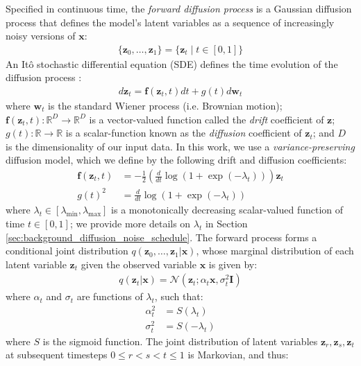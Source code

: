 \documentclass[ oneside,%
                    author={George Herbert},
                    degree={MSci},
                     title={Video Diffusion Models for Climate Simulations},
                  subtitle={}]{dissertation}
\begin{document}
Specified in continuous time, the \textit{forward diffusion process} is a Gaussian diffusion process that defines the model's latent variables as a sequence of increasingly noisy versions of $\mathbf{x}$:
\begin{align}
      \{\mathbf{z}_0,\ldots,\mathbf{z}_1\}=\{\mathbf{z}_t\mid t\in[0,1]\}
\end{align}
An It\^{o} stochastic differential equation (SDE) defines the time evolution of the diffusion process \cite{Score_Based_Song}:
\begin{align}
      d\mathbf{z}_t=\mathbf{f}(\mathbf{z}_t,t)dt + g(t)d\mathbf{w}_t\label{eq:forward_sde}
\end{align}
where $\mathbf{w}_t$ is the standard Wiener process (i.e. Brownian motion); $\mathbf{f}(\mathbf{z}_t, t):\mathbb{R}^D\to\mathbb{R}^D$ is a vector-valued function called the \textit{drift} coefficient of $\mathbf{z}$; $g(t):\mathbb{R}\to\mathbb{R}$ is a scalar-function known as the \textit{diffusion} coefficient of $\mathbf{z}_t$; and $D$ is the dimensionality of our input data. In this work, we use a \textit{variance-preserving} diffusion model, which we define by the following drift and diffusion coefficients:
\begin{align}
      \mathbf{f}(\mathbf{z}_t,t)&=-\frac{1}{2}\left(\frac{d}{dt}\log\left(1+\exp(-\lambda_t)\right)\right)\mathbf{z}_t\\
      g(t)^2&=\frac{d}{dt}\log\left(1+\exp(-\lambda_t)\right)\label{eq:diffusion_coefficient_scalar}
\end{align}
where $\lambda_t\in[\lambda_{\min}, \lambda_{\max}]$ is a monotonically decreasing scalar-valued function of time $t\in[0,1]$; we provide more details on $\lambda_t$ in Section \ref{sec:background_diffusion_noise_schedule}. The forward process forms a conditional joint distribution $q(\mathbf{z}_0,\ldots,\mathbf{z}_1|\mathbf{x})$, whose marginal distribution of each latent variable $\mathbf{z}_t$ given the observed variable $\mathbf{x}$ is given by:
\begin{align}
      q(\mathbf{z}_t|\mathbf{x})=\mathcal{N}\left(\mathbf{z}_t;\alpha_t\mathbf{x},\sigma_t^2\mathbf{I}\right)
      \label{eq:q_z_t_given_x}
\end{align}
where $\alpha_t$ and $\sigma_t$ are functions of $\lambda_t$, such that:
\begin{align}
      \alpha_t^2 &= S(\lambda_t)\\
      \sigma_t^2 &= S(-\lambda_t)
\end{align}
where $S$ is the sigmoid function. The joint distribution of latent variables $\mathbf{z}_r,\mathbf{z}_s,\mathbf{z}_t$ at subsequent timesteps $0\le r < s < t \le 1$ is Markovian, and thus:
\end{document}
